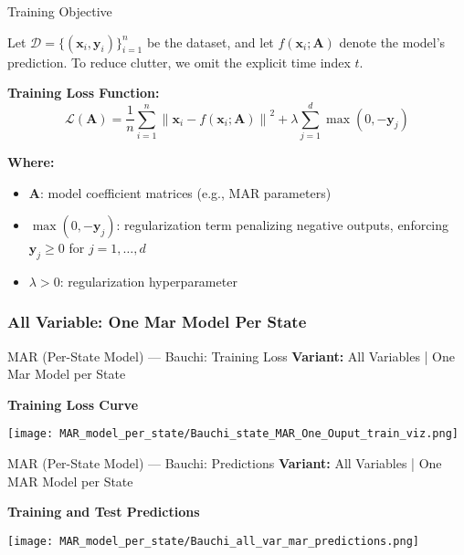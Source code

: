 \documentclass{beamer}
\begin{document}
\begin{frame}{Training Objective}

Let \( \mathcal{D} = \{(\mathbf{x}_i, \mathbf{y}_i)\}_{i=1}^{n} \) be the dataset, and let \( f(\mathbf{x}_i; \mathbf{A}) \) denote the model’s prediction.  
To reduce clutter, we omit the explicit time index \( t \).

\vspace{1em}

\textbf{Training Loss Function:}
\[
\boxed{
\mathcal{L}(\mathbf{A}) = \frac{1}{n} \sum_{i=1}^{n} \left\| \mathbf{x}_i - f(\mathbf{x}_i; \mathbf{A}) \right\|^2 
+ \lambda \sum_{j=1}^{d} \max(0, -\mathbf{y}_j)
}
\]

\vspace{1em}

\small
\textbf{Where:}
\begin{itemize}
    \item \( \mathbf{A} \): model coefficient matrices (e.g., MAR parameters)
    \item \( \max(0, -\mathbf{y}_j) \): regularization term penalizing negative outputs, enforcing \( \mathbf{y}_j \geq 0 \) for \( j = 1, \dots, d \)
    \item \( \lambda > 0 \): regularization hyperparameter
\end{itemize}

\end{frame}

\subsubsection{All Variable: One Mar Model Per State}


\begin{frame}{MAR (Per-State Model) — Bauchi: Training Loss}
\textbf{Variant:} All Variables | One Mar Model per State
\vspace{0.5em}

\textbf{Training Loss Curve}
\begin{center}
    \texttt{[image: MAR\_model\_per\_state/Bauchi\_state\_MAR\_One\_Ouput\_train\_viz.png]}
\end{center}
\end{frame}

\begin{frame}{MAR (Per-State Model) — Bauchi: Predictions}
\textbf{Variant:} All Variables | One MAR Model per State
\vspace{0.5em}

\textbf{Training and Test Predictions}
\begin{center}
    \texttt{[image: MAR\_model\_per\_state/Bauchi\_all\_var\_mar\_predictions.png]}
\end{center}
\end{frame}
\end{document}
